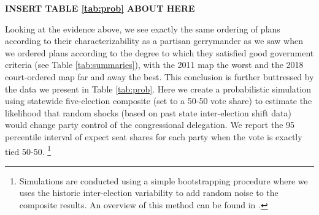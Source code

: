 \par
    
        \begin{center}\textbf{INSERT TABLE \ref{tab:prob} ABOUT HERE} \end{center}
%
\par
    Looking at the evidence above, we see exactly the same ordering of plans according to their characterizability as a partisan gerrymander as we saw when we ordered plans according to the degree to which they satisfied good government criteria (see Table \ref{tab:summaries}), with the 2011 map the worst and the 2018 court-ordered map far and away the best. This conclusion is further buttressed by the data we present in Table \ref{tab:prob}. Here we create a probabilistic simulation using statewide five-election composite (set to a 50-50 vote share) to estimate the likelihood that random shocks (based on past state inter-election shift data) would change party control of the congressional delegation. We report the 95 percentile interval of expect seat shares for each party when the vote is exactly tied 50-50.
        \footnote{Simulations are conducted using a simple bootstrapping procedure where we uses the historic inter-election variability to add random noise to the composite results. An overview of this method can be found in \citet{Efron1979}.}
